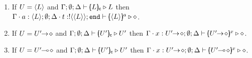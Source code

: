 \begin{proposition}
\begin{enumerate}
\begin{enumerate}
			\item	If $U = \langle L \rangle$ and $\Gamma; \emptyset; \Delta \vdash [\!\!(L)\!\!]_{\mathsf{c}} \triangleright L$ then
					$\Gamma \cdot a: \langle L \rangle; \emptyset; \Delta \cdot t: ! \langle \langle L \rangle \rangle ; \mathtt{end} \vdash [\!\!(\langle L \rangle)\!\!]^{a} \triangleright \diamond$.
	
			\item	If $U = U'\!\! \rightarrow\! \diamond$ and  $\Gamma; \emptyset; \Delta \vdash [\!\!(U')\!\!]_{\mathsf{c}} \triangleright U'$ then
					$\Gamma \cat x: \shot{U'}; \es;\Delta \proves \mapchar{\shot{U'}}{x} \hastype \Proc$.
	
			\item	
{} If $U = U'\!\! \multimap\! \diamond$ and   $\Gamma; \emptyset; \Delta \vdash [\!\!(U')\!\!]_{\mathsf{c}} \triangleright U'$ then
					$\Gamma \cat x: \shot{U'}; \es;\Delta \proves \mapchar{\lhot{U'}}{x} \hastype \Proc$.
		\end{enumerate}
	\end{enumerate}
\end{proposition}

